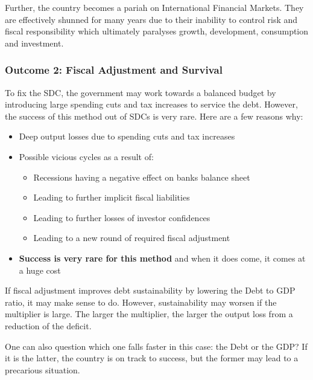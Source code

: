 \documentclass[12pt, letterpaper]{article}
\begin{document}
Further, the country becomes a pariah on International Financial Markets. They are effectively shunned for many years due to their inability to control risk and fiscal responsibility which ultimately paralyses growth, development, consumption and investment.

\subsubsection{Outcome 2: Fiscal Adjustment and Survival}
To fix the SDC, the government may work towards a balanced budget by introducing large spending cuts and tax increases to service the debt. However, the success of this method out of SDCs is very rare. Here are a few reasons why:
\begin{itemize}
	\item Deep output losses due to spending cuts and tax increases
	\item Possible vicious cycles as a result of:
		\begin{itemize}
			\item Recessions having a negative effect on banks balance sheet
			\item Leading to further implicit fiscal liabilities
			\item Leading to further losses of investor confidences
			\item Leading to a new round of required fiscal adjustment
		\end{itemize}
	\item \textbf{Success is very rare for this method} and when it does come, it comes at a huge cost
\end{itemize}
If fiscal adjustment improves debt sustainability by lowering the Debt to GDP ratio, it may make sense to do. However, sustainability may worsen if the multiplier is large. The larger the multiplier, the larger the output loss from a reduction of the deficit.

One can also question which one falls faster in this case: the Debt or the GDP? If it is the latter, the country is on track to success, but the former may lead to a precarious situation.
\end{document}
